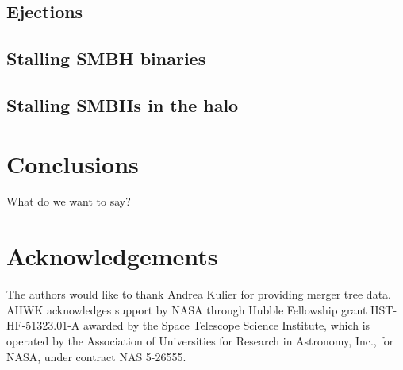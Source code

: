 \documentclass[english, apj]{emulateapj}
\begin{document}
\subsection{Ejections}

\subsection{Stalling SMBH binaries}

\subsection{Stalling SMBHs in the halo}





\section{Conclusions}\label{sec:conclusions}
What do we want to say?



\section*{Acknowledgements}

The authors would like to thank Andrea Kulier for providing merger tree data. AHWK acknowledges support by NASA through Hubble Fellowship grant HST-HF-51323.01-A awarded by the Space Telescope Science Institute, which is operated by the Association of Universities for Research in Astronomy, Inc., for NASA, under contract NAS 5-26555. 








\end{document}
